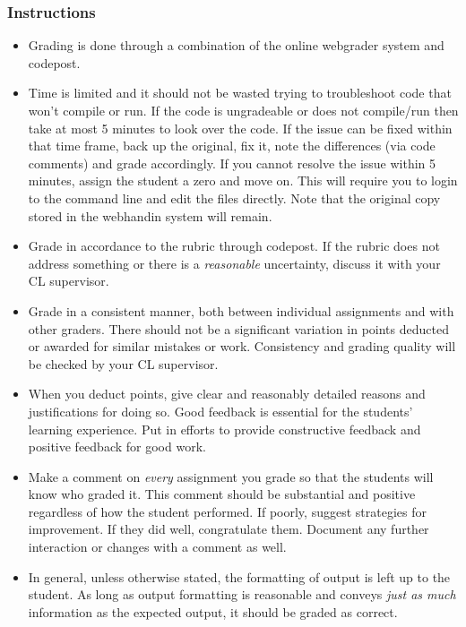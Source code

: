 \documentclass[12pt]{scrartcl}
\begin{document}
\subsubsection*{Instructions}

\begin{itemize}
  \item Grading is done through a combination of the online webgrader system
    and codepost.    
  \item Time is limited and it should not be wasted trying to troubleshoot 
    code that won't compile or run.  If the code is ungradeable or does not
    compile/run then take at most 5 minutes to look over
    the code.  If the issue can be fixed within that time frame, back up the
    original, fix it, note the differences (via code comments) and grade 
    accordingly.  If you cannot resolve the issue within 5 minutes, assign
    the student a zero and move on.  This will require you to login to the
    command line and edit the files directly.  Note that the original copy
    stored in the webhandin system will remain.
  \item Grade in accordance to the rubric through codepost.  If the rubric 
    does not address something or there is a \emph{reasonable} uncertainty, 
    discuss it with your CL supervisor.
  \item Grade in a consistent manner, both between individual assignments and
    with other graders.  There should not be a significant variation in
    points deducted or awarded for similar mistakes or work.  Consistency 
    and grading quality will be checked by your CL supervisor.
  \item When you deduct points, give clear and reasonably detailed reasons
    and justifications for doing so.  Good feedback is essential for the
    students' learning experience.  Put in efforts to provide constructive
    feedback and positive feedback for good work.
  \item Make a comment on \emph{every} assignment you grade so that the students
    will know who graded it.  This comment should be substantial and positive 
    regardless of how the student performed.  If poorly, suggest strategies 
    for improvement.  If they did well, congratulate them.  Document any further
    interaction or changes with a comment as well.
  \item In general, unless otherwise stated, the formatting of output is
    left up to the student.  As long as output formatting is reasonable and
    conveys \emph{just as much} information as the expected output, it should
    be graded as correct.
\end{itemize}
\end{document}
